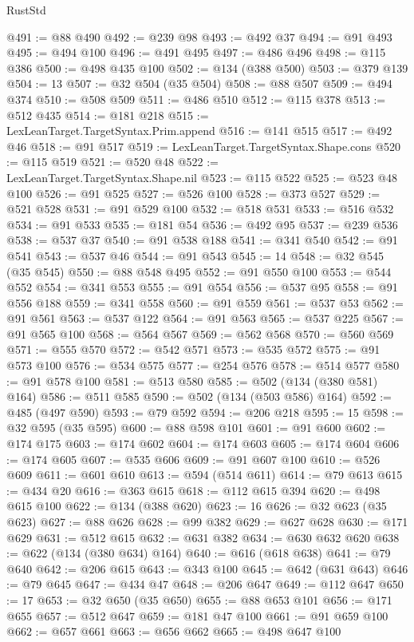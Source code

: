 \begin{lexlean}{RustStd}
\begin{coremodule}
@491 := @88 @490
@492 := @239 @98
@493 := @492 @37
@494 := @91 @493
@495 := @494 @100
@496 := @491 @495
@497 := @486 @496
@498 := @115 @386
@500 := @498 @435 @100
@502 := @134 (@388 @500)
@503 := @379 @139
@504 := 13
@507 := @32 @504 (@35 @504)
@508 := @88 @507
@509 := @494 @374
@510 := @508 @509
@511 := @486 @510
@512 := @115 @378
@513 := @512 @435
@514 := @181 @218
@515 := LexLeanTarget.TargetSyntax.Prim.append
@516 := @141 @515
@517 := @492 @46
@518 := @91 @517
@519 := LexLeanTarget.TargetSyntax.Shape.cons
@520 := @115 @519
@521 := @520 @48
@522 := LexLeanTarget.TargetSyntax.Shape.nil
@523 := @115 @522
@525 := @523 @48 @100
@526 := @91 @525
@527 := @526 @100
@528 := @373 @527
@529 := @521 @528
@531 := @91 @529 @100
@532 := @518 @531
@533 := @516 @532
@534 := @91 @533
@535 := @181 @54
@536 := @492 @95
@537 := @239 @536
@538 := @537 @37
@540 := @91 @538 @188
@541 := @341 @540
@542 := @91 @541
@543 := @537 @46
@544 := @91 @543
@545 := 14
@548 := @32 @545 (@35 @545)
@550 := @88 @548 @495
@552 := @91 @550 @100
@553 := @544 @552
@554 := @341 @553
@555 := @91 @554
@556 := @537 @95
@558 := @91 @556 @188
@559 := @341 @558
@560 := @91 @559
@561 := @537 @53
@562 := @91 @561
@563 := @537 @122
@564 := @91 @563
@565 := @537 @225
@567 := @91 @565 @100
@568 := @564 @567
@569 := @562 @568
@570 := @560 @569
@571 := @555 @570
@572 := @542 @571
@573 := @535 @572
@575 := @91 @573 @100
@576 := @534 @575
@577 := @254 @576
@578 := @514 @577
@580 := @91 @578 @100
@581 := @513 @580
@585 := @502 (@134 (@380 @581) @164)
@586 := @511 @585
@590 := @502 (@134 (@503 @586) @164)
@592 := @485 (@497 @590)
@593 := @79 @592
@594 := @206 @218
@595 := 15
@598 := @32 @595 (@35 @595)
@600 := @88 @598 @101
@601 := @91 @600
@602 := @174 @175
@603 := @174 @602
@604 := @174 @603
@605 := @174 @604
@606 := @174 @605
@607 := @535 @606
@609 := @91 @607 @100
@610 := @526 @609
@611 := @601 @610
@613 := @594 (@514 @611)
@614 := @79 @613
@615 := @434 @20
@616 := @363 @615
@618 := @112 @615 @394
@620 := @498 @615 @100
@622 := @134 (@388 @620)
@623 := 16
@626 := @32 @623 (@35 @623)
@627 := @88 @626
@628 := @99 @382
@629 := @627 @628
@630 := @171 @629
@631 := @512 @615
@632 := @631 @382
@634 := @630 @632 @620
@638 := @622 (@134 (@380 @634) @164)
@640 := @616 (@618 @638)
@641 := @79 @640
@642 := @206 @615
@643 := @343 @100
@645 := @642 (@631 @643)
@646 := @79 @645
@647 := @434 @47
@648 := @206 @647
@649 := @112 @647
@650 := 17
@653 := @32 @650 (@35 @650)
@655 := @88 @653 @101
@656 := @171 @655
@657 := @512 @647
@659 := @181 @47 @100
@661 := @91 @659 @100
@662 := @657 @661
@663 := @656 @662
@665 := @498 @647 @100

\end{coremodule}
\end{lexlean}
